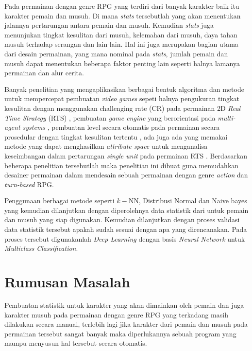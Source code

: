 Pada permainan dengan genre RPG yang terdiri dari banyak karakter baik itu karakter pemain dan musuh. Di mana \textit{stats} tersebutlah yang akan menentukan jalannya pertarungan antara pemain dan musuh. Kemudian \textit{stats} juga menunjukan tingkat kesulitan dari musuh, kelemahan dari musuh, daya tahan musuh terhadap serangan dan lain-lain. Hal ini juga merupakan bagian utama dari desain permainan, yang mana nominal pada \textit{stats}, jumlah pemain dan musuh dapat menentukan beberapa faktor penting lain seperti halnya lamanya permainan dan alur cerita. 
\vspace{1ex}

Banyak penelitian yang mengaplikasikan berbagai bentuk algoritma dan metode untuk mempercepat pembuatan \textit{video games} sepeti halnya pengukuran tingkat kesulitan dengan menggunakan challenging rate (CR) pada permainan 2D \textit{Real Time Strategy} (RTS) \citep{Christyowidiasmoro2016}, pembuatan \textit{game engine} yang berorientasi pada \textit{multi-agent systems} \citep{Marin-Lora2020}, pembuatan level secara otomatis pada permainan secara prosedular dengan tingkat kesulitan tertentu \citep{Wu2018}, ada juga ada yang memakai metode yang dapat menghasilkan \textit{attribute space} untuk menganalisa keseimbangan dalam pertarungan \textit{single unit} pada permainan RTS \citep{Bangay2014}. Berdasarkan beberapa penelitian tersebutlah maka penelitian ini dibuat guna memudahkan desainer permainan dalam mendesain sebuah permainan dengan genre \textit{action} dan \textit{turn-based} RPG.
\vspace{1ex}

Penggunaan berbagai metode seperti $k-$NN, Distribusi Normal dan Naive bayes yang kemudian dilanjutkan dengan diperolehnya data statistik dari untuk pemain dan musuh yang siap digunakan. Kemudian dilanjutkan dengan proses validasi data statistik tersebut apakah sudah sesuai dengan apa yang direncanakan. Pada proses tersebut digunakanlah \textit{Deep Learning} dengan basis \textit{Neural Network} untuk \textit{Multiclass Classification}.
\vspace{1ex}

\section{Rumusan Masalah}
\vspace{1ex}

Pembuatan statistik untuk karakter yang akan dimainkan oleh pemain dan juga karakter musuh pada permainan dengan genre RPG yang terkadang masih dilakukan secara manual, terlebih lagi jika karakter dari pemain dan musuh pada permainan tersebut sangat banyak maka diperlukannya sebuah program yang mampu menyusun hal tersebut secara otomatis.
\vspace{1ex}


